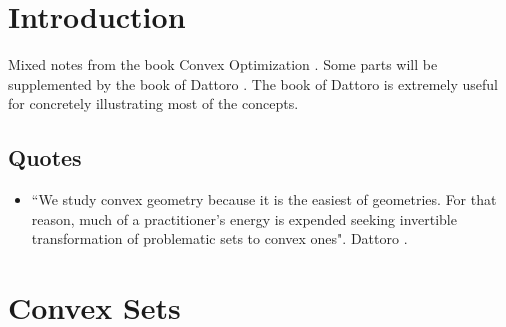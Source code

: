 \documentclass[a4paper, oneside]{book}
\begin{document}
\chapter{Introduction}

Mixed notes from the book Convex Optimization \cite{boyd04}. Some parts will be supplemented by the book of Dattoro \cite{dattorro10}. The book of Dattoro is extremely useful for concretely illustrating most of the concepts. 

\section*{Quotes}
\begin{itemize}
\item ``We study convex geometry because it is the easiest of geometries. For that reason, much of a practitioner’s energy is expended seeking invertible transformation of problematic sets to convex ones". Dattoro \cite{dattorro10}.
\end{itemize}


\chapter{Convex Sets}
\end{document}
